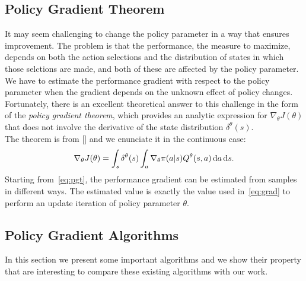 \subsection{Policy Gradient Theorem}
It may seem challenging to change the policy parameter in a way that ensures improvement. The problem is that the performance, \ie the measure to maximize, depends on both the action selections and the distribution of states in which those selctions are made, and both of these are affected by the policy parameter. We have to estimate the performance gradient with respect to the policy parameter when the gradient depends on the unknown effect of policy changes. Fortunately, there is an excellent theoretical answer to this challenge in the form of the \emph{policy gradient theorem}, which provides an analytic expression for $\nabla_{\theta}J(\theta)$ that does not involve the derivative of the state distribution $\delta^{\theta}(s)$.\\
\newline
The theorem is from [\citet{Sutton1999PolicyGM}] and we enunciate it in the continuous case:
\begin{align}
\nabla_{\theta}J(\theta) = \int_s \delta^{\theta}(s) \int_a \nabla_{\theta} \pi(a|s) Q^{\theta}(s,a) \,\mathrm{d} a \,\mathrm{d} s. \label{eq:pgt}
\end{align}
Starting from~\eqref{eq:pgt}, the performance gradient can be estimated from samples in different ways. The estimated value is exactly the value used in~\eqref{eq:grad} to perform an update iteration of policy parameter $\theta$.

\subsection{Policy Gradient Algorithms}
In this section we present some important algorithms and we show their property that are interesting to compare these existing algorithms with our work.
